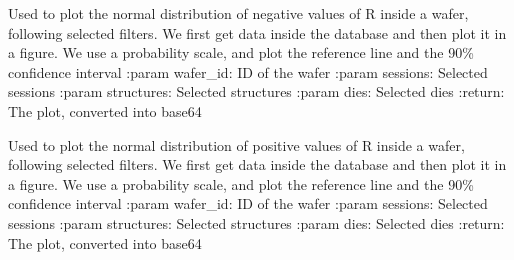\documentclass[letterpaper,10pt,english]{sphinxmanual}
\begin{document}
\begin{fulllineitems}
\label{\detokenize{normal_plots:normal_plots.R_normal_distrib_neg}}
\pysigstartsignatures
{}
\pysigstopsignatures
\sphinxAtStartPar
Used to plot the normal distribution of negative values of R inside a wafer, following selected filters.
We first get data inside the database and then plot it in a figure. We use a probability scale, and plot the reference line and the 90\% confidence interval
:param wafer\_id: ID of the wafer
:param sessions: Selected sessions
:param structures: Selected structures
:param dies: Selected dies
:return: The plot, converted into base64

\end{fulllineitems}


\begin{fulllineitems}
\label{\detokenize{normal_plots:normal_plots.R_normal_distrib_pos}}
\pysigstartsignatures
{}
\pysigstopsignatures
\sphinxAtStartPar
Used to plot the normal distribution of positive values of R inside a wafer, following selected filters.
We first get data inside the database and then plot it in a figure. We use a probability scale, and plot the reference line and the 90\% confidence interval
:param wafer\_id: ID of the wafer
:param sessions: Selected sessions
:param structures: Selected structures
:param dies: Selected dies
:return: The plot, converted into base64

\end{fulllineitems}

\end{document}
